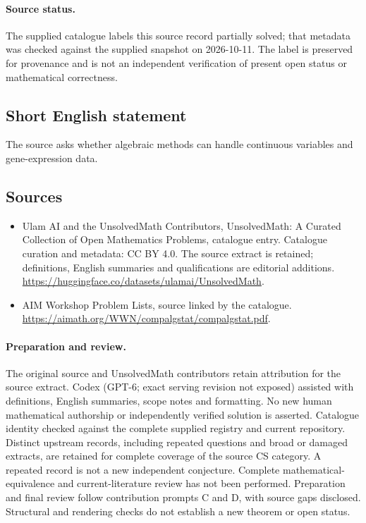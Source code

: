 \documentclass[11pt]{article}
\begin{document}
\paragraph{Source status.}
The supplied catalogue labels this source record partially solved; that metadata was checked against the supplied snapshot on 2026-10-11. The label is preserved for provenance and is not an independent verification of present open status or mathematical correctness.
\subsection{Short English statement}
The source asks whether algebraic methods can handle continuous variables and gene-expression data.
\subsection{Sources}
\begin{itemize}
\item[\hypertarget{source:statement:1}{S1}] Ulam AI and the UnsolvedMath Contributors, UnsolvedMath: A Curated Collection of Open Mathematics Problems, catalogue entry. Catalogue curation and metadata: CC BY 4.0. The source extract is retained; definitions, English summaries and qualifications are editorial additions.
\url{https://huggingface.co/datasets/ulamai/UnsolvedMath}.
\item[\hypertarget{source:statement:2}{S2}] AIM Workshop Problem Lists, source linked by the catalogue.
\url{https://aimath.org/WWN/compalgstat/compalgstat.pdf}.
\end{itemize}
\paragraph{Preparation and review.}
The original source and UnsolvedMath contributors retain attribution for the source extract. Codex (GPT-6; exact serving revision not exposed) assisted with definitions, English summaries, scope notes and formatting. No new human mathematical authorship or independently verified solution is asserted. Catalogue identity checked against the complete supplied registry and current repository. Distinct upstream records, including repeated questions and broad or damaged extracts, are retained for complete coverage of the source CS category. A repeated record is not a new independent conjecture. Complete mathematical-equivalence and current-literature review has not been performed. Preparation and final review follow contribution prompts C and D, with source gaps disclosed. Structural and rendering checks do not establish a new theorem or open status.
\label{end:statement}
\end{document}
